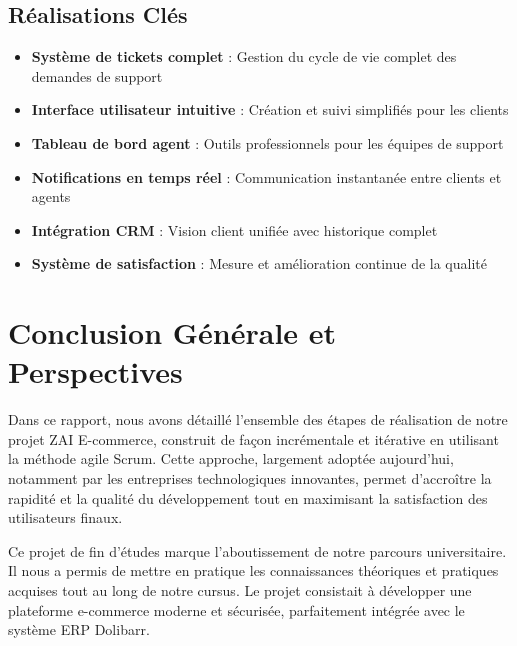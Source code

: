 \documentclass[12pt,a4paper]{report}
\begin{document}
\subsection{Réalisations Clés}
\begin{itemize}
\item \textbf{Système de tickets complet} : Gestion du cycle de vie complet des demandes de support
\item \textbf{Interface utilisateur intuitive} : Création et suivi simplifiés pour les clients
\item \textbf{Tableau de bord agent} : Outils professionnels pour les équipes de support
\item \textbf{Notifications en temps réel} : Communication instantanée entre clients et agents
\item \textbf{Intégration CRM} : Vision client unifiée avec historique complet
\item \textbf{Système de satisfaction} : Mesure et amélioration continue de la qualité
\end{itemize}
\vspace{1cm}
\vspace{1cm}
\vspace{1cm}
\vspace{14cm}
\section*{Conclusion Générale et Perspectives}

Dans ce rapport, nous avons détaillé l'ensemble des étapes de réalisation de notre projet ZAI E-commerce, construit de façon incrémentale et itérative en utilisant la méthode agile Scrum. Cette approche, largement adoptée aujourd'hui, notamment par les entreprises technologiques innovantes, permet d'accroître la rapidité et la qualité du développement tout en maximisant la satisfaction des utilisateurs finaux.

Ce projet de fin d'études marque l'aboutissement de notre parcours universitaire. Il nous a permis de mettre en pratique les connaissances théoriques et pratiques acquises tout au long de notre cursus. Le projet consistait à développer une plateforme e-commerce moderne et sécurisée, parfaitement intégrée avec le système ERP Dolibarr.
\end{document}
